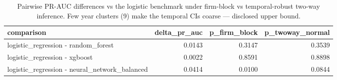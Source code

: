 \begin{table}[htbp]
\centering
\caption{Pairwise PR-AUC differences vs the logistic benchmark under firm-block vs temporal-robust two-way inference. Few year clusters (9) make the temporal CIs coarse — disclosed upper bound.}
\label{tab:v2_temporal_sig}
\small
\begin{tabular}{lrrr}
\toprule
comparison & delta\_pr\_auc & p\_firm\_block & p\_twoway\_normal \\
\midrule
logistic\_regression - random\_forest & 0.0143 & 0.3147 & 0.3539 \\
logistic\_regression - xgboost & 0.0022 & 0.8591 & 0.8898 \\
logistic\_regression - neural\_network\_balanced & 0.0414 & 0.0100 & 0.0844 \\
\bottomrule
\end{tabular}
\end{table}
